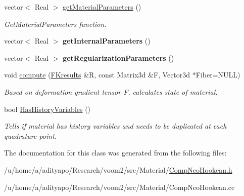 \begin{DoxyCompactItemize}
\item 
\hypertarget{classvoom_1_1_comp_neo_hookean_a6b003412bbe4fdad93b104087d653553}{
vector$<$ Real $>$ \hyperlink{classvoom_1_1_comp_neo_hookean_a6b003412bbe4fdad93b104087d653553}{getMaterialParameters} ()}
\label{classvoom_1_1_comp_neo_hookean_a6b003412bbe4fdad93b104087d653553}

\begin{DoxyCompactList}\small\item\em GetMaterialParameters function. \item\end{DoxyCompactList}\item 
\hypertarget{classvoom_1_1_comp_neo_hookean_a3aec2497fa4680ed5ea3c59b8751a974}{
vector$<$ Real $>$ {\bfseries getInternalParameters} ()}
\label{classvoom_1_1_comp_neo_hookean_a3aec2497fa4680ed5ea3c59b8751a974}

\item 
\hypertarget{classvoom_1_1_comp_neo_hookean_a2e9e63896e3d00313ee65646fa867995}{
vector$<$ Real $>$ {\bfseries getRegularizationParameters} ()}
\label{classvoom_1_1_comp_neo_hookean_a2e9e63896e3d00313ee65646fa867995}

\item 
\hypertarget{classvoom_1_1_comp_neo_hookean_a53b1402fd5c548c578ca40b14c4f6fcb}{
void \hyperlink{classvoom_1_1_comp_neo_hookean_a53b1402fd5c548c578ca40b14c4f6fcb}{compute} (\hyperlink{structvoom_1_1_mechanics_material_1_1_f_kresults}{FKresults} \&R, const Matrix3d \&F, Vector3d $\ast$Fiber=NULL)}
\label{classvoom_1_1_comp_neo_hookean_a53b1402fd5c548c578ca40b14c4f6fcb}

\begin{DoxyCompactList}\small\item\em Based on deformation gradient tensor F, calculates state of material. \item\end{DoxyCompactList}\item 
\hypertarget{classvoom_1_1_comp_neo_hookean_a18903df0e0c9aba1a810d04904d9a287}{
bool \hyperlink{classvoom_1_1_comp_neo_hookean_a18903df0e0c9aba1a810d04904d9a287}{HasHistoryVariables} ()}
\label{classvoom_1_1_comp_neo_hookean_a18903df0e0c9aba1a810d04904d9a287}

\begin{DoxyCompactList}\small\item\em Tells if material has history variables and needs to be duplicated at each quadrature point. \item\end{DoxyCompactList}\end{DoxyCompactItemize}


The documentation for this class was generated from the following files:\begin{DoxyCompactItemize}
\item 
/u/home/a/adityapo/Research/voom2/src/Material/\hyperlink{_comp_neo_hookean_8h}{CompNeoHookean.h}\item 
/u/home/a/adityapo/Research/voom2/src/Material/CompNeoHookean.cc\end{DoxyCompactItemize}
